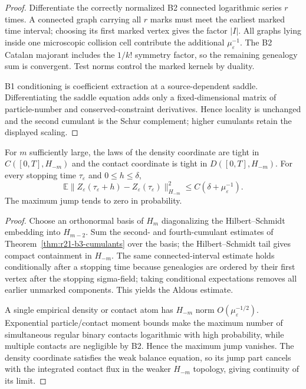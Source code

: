 \begin{proof}
Differentiate the correctly normalized B2 connected logarithmic series $r$
times.  A connected graph carrying all $r$ marks must meet the earliest
marked time interval; choosing its first marked vertex gives the factor
$|I|$.  All graphs lying inside one microscopic collision cell contribute the
additional $\mu_\varepsilon^{-1}$.  The B2 Catalan majorant includes the
$1/k!$ symmetry factor, so the remaining genealogy sum is convergent.  Test
norms control the marked kernels by duality.

B1 conditioning is coefficient extraction at a source-dependent saddle.
Differentiating the saddle equation adds only a fixed-dimensional matrix of
particle-number and conserved-constraint derivatives.  Hence locality is
unchanged and the second cumulant is the Schur complement; higher cumulants
retain the displayed scaling.
\end{proof}

\begin{lemma}
\label{lem:r21-b3-tight}
For $m$ sufficiently large, the laws of the density coordinate are tight in
$C([0,T],H_{-m})$ and the contact coordinate is tight in
$D([0,T],H_{-m})$.  For every stopping time $\tau_\varepsilon$ and
$0\le h\le\delta$,
\[
 \mathbb E\|Z_\varepsilon(\tau_\varepsilon+h)-
 Z_\varepsilon(\tau_\varepsilon)\|_{H_{-m}}^2
 \le C(\delta+\mu_\varepsilon^{-1}).
\]
The maximum jump tends to zero in probability.
\end{lemma}

\begin{proof}
Choose an orthonormal basis of $H_m$ diagonalizing the Hilbert--Schmidt
embedding into $H_{m-2}$.  Sum the second- and fourth-cumulant estimates of
Theorem~\ref{thm:r21-b3-cumulants} over the basis; the Hilbert--Schmidt tail
gives compact containment in $H_{-m}$.  The same connected-interval estimate
holds conditionally after a stopping time because genealogies are ordered by
their first vertex after the stopping sigma-field; taking conditional
expectations removes all earlier unmarked components.  This yields the
Aldous estimate.

A single empirical density or contact atom has $H_{-m}$ norm
$O(\mu_\varepsilon^{-1/2})$.  Exponential particle/contact moment bounds make
the maximum number of simultaneous regular binary contacts logarithmic with
high probability, while multiple contacts are negligible by B2.  Hence the
maximum jump vanishes.  The density coordinate satisfies the weak balance
equation, so its jump part cancels with the integrated contact flux in the
weaker $H_{-m}$ topology, giving continuity of its limit.
\end{proof}

